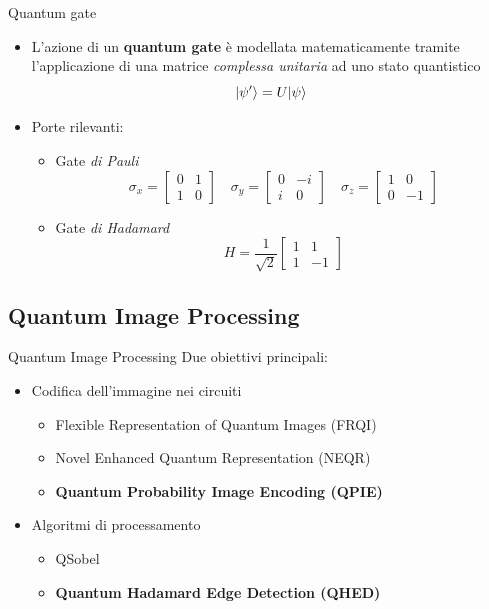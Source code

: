 \documentclass{beamer}
\DeclarePairedDelimiter\ket{\lvert}{\rangle}
\begin{document}
	\begin{frame}{Quantum gate}
		\begin{itemize}
			\item L'azione di un \textbf{quantum gate} è modellata matematicamente
			tramite l'applicazione di una matrice \emph{complessa unitaria} ad uno
			stato quantistico
			\[
			\ket{\psi'} = U\ket{\psi}
			\]
			\pause
			\item Porte rilevanti:
			\begin{itemize}
				\item Gate \emph{di Pauli}
				\[
				\sigma_x = 
				\begin{bmatrix}
					0 & 1 \\
					1 & 0
				\end{bmatrix}
				\quad
				\sigma_y = 
				\begin{bmatrix}
					0 & -i \\
					i & 0
				\end{bmatrix}
				\quad
				\sigma_z = 
				\begin{bmatrix}
					1 & 0 \\
					0 & -1
				\end{bmatrix}
				\]
				\item Gate \emph{di Hadamard}
				\[
				H = \frac{1}{\sqrt{2}}
				\begin{bmatrix}
					1 & 1 \\
					1 & -1
				\end{bmatrix}
				\]
			\end{itemize}
		\end{itemize}
	\end{frame}

	\subsection{Quantum Image Processing}

	\begin{frame}{Quantum Image Processing}
		Due obiettivi principali:
		\begin{itemize}
			\item<1-> Codifica dell'immagine nei circuiti
			\begin{itemize}
				\item Flexible Representation of Quantum Images (FRQI) \cite{Le2011}
				\item Novel Enhanced Quantum Representation (NEQR) \cite{Zhang2013}
				\item \textbf{Quantum Probability Image Encoding (QPIE)} \cite{Yao2018}
			\end{itemize}
			\item<2-> Algoritmi di processamento
			\begin{itemize}
				\item QSobel \cite{Zhang2014}
				\item \textbf{Quantum Hadamard Edge Detection (QHED)} \cite{Yao2018}
			\end{itemize}
		\end{itemize}
	\end{frame}
\end{document}
